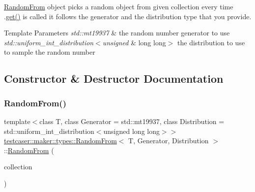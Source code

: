 \mbox{\hyperlink{structtestcaser_1_1maker_1_1types_1_1RandomFrom}{Random\+From}} object picks a random object from given collection every time .\mbox{\hyperlink{structtestcaser_1_1maker_1_1types_1_1RandomFrom_a6f72354c54f49a18de70b057a3b0f04b}{get()}} is called it follows the generator and the distribution type that you provide. 


\begin{DoxyTemplParams}{Template Parameters}
{\em std\+::mt19937} & the random number generator to use \\
\hline
{\em std\+::uniform\+\_\+int\+\_\+distribution$<$unsigned} & long long$>$ the distribution to use to sample the random number \\
\hline
\end{DoxyTemplParams}


\subsection{Constructor \& Destructor Documentation}
\mbox{\label{structtestcaser_1_1maker_1_1types_1_1RandomFrom_a12bdbf6714da58c108d8282bc1e002cf}} 
\subsubsection{\texorpdfstring{RandomFrom()}{RandomFrom()}}
{\footnotesize\ttfamily template$<$class T, class Generator = std\+::mt19937, class Distribution = std\+::uniform\+\_\+int\+\_\+distribution$<$unsigned long long$>$$>$ \\
\mbox{\hyperlink{structtestcaser_1_1maker_1_1types_1_1RandomFrom}{testcaser\+::maker\+::types\+::\+Random\+From}}$<$ T, Generator, Distribution $>$\+::\mbox{\hyperlink{structtestcaser_1_1maker_1_1types_1_1RandomFrom}{Random\+From}} (\begin{DoxyParamCaption}\item[{std\+::vector$<$ T $>$}]{collection }\end{DoxyParamCaption})\hspace{0.3cm}{\ttfamily [inline]}}



